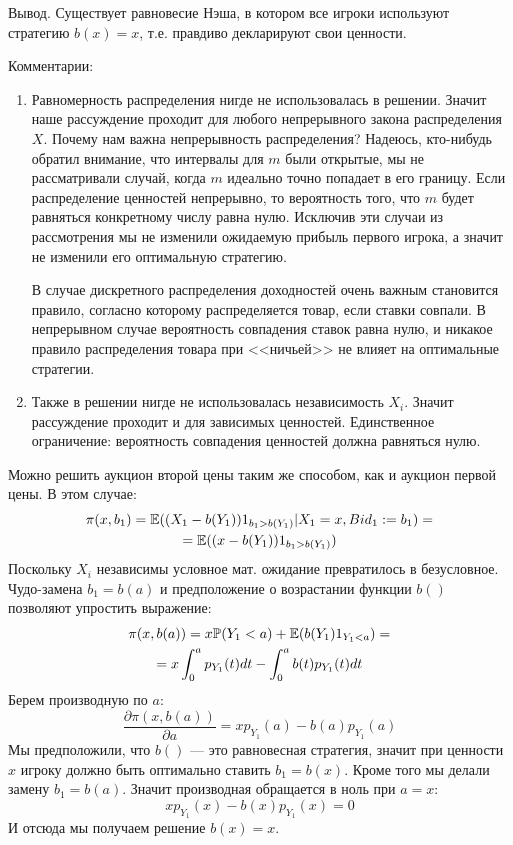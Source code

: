 \begin{enumerate}
Вывод. Существует равновесие Нэша, в котором все игроки используют стратегию $ b(x)=x $, т.е. правдиво декларируют свои ценности.

Комментарии:
\begin{enumerate}
\item Равномерность распределения нигде не использовалась в решении. Значит наше рассуждение проходит для любого непрерывного закона распределения $ X $.
Почему нам важна непрерывность распределения? Надеюсь, кто-нибудь обратил внимание, что интервалы для $ m $ были открытые, мы не рассматривали случай, когда $ m $ идеально точно попадает в его границу. Если распределение ценностей непрерывно, то вероятность того, что $ m $ будет равняться конкретному числу равна нулю. Исключив эти случаи из рассмотрения мы не изменили ожидаемую прибыль первого игрока, а значит не изменили его оптимальную стратегию. 

В случае дискретного распределения доходностей очень важным становится правило, согласно которому распределяется товар, если ставки совпали. В непрерывном случае вероятность совпадения ставок равна нулю, и никакое правило распределения товара при <<ничьей>> не влияет на оптимальные стратегии.
\item Также в решении нигде не использовалась независимость $ X_{i} $. Значит рассуждение проходит и для зависимых ценностей. Единственное ограничение: вероятность совпадения ценностей должна равняться нулю.
\end{enumerate}


\begin{myex}
Можно решить аукцион второй цены таким же способом, как и аукцион первой цены. В этом случае:
\begin{multline}
\pi(x,b_{1})=\mathbb{E}((X_{1}-b(Y_{1}))1_{b_{1}>b(Y_{1})}|X_{1}=x,Bid_{1}:=b_{1})=\\
=\mathbb{E}((x-b(Y_{1}))1_{b_{1}>b(Y_{1})})
\end{multline}
Поскольку $ X_{i} $ независимы условное мат. ожидание превратилось в безусловное. Чудо-замена $ b_{1}=b(a) $ и предположение о возрастании функции $ b() $ позволяют упростить выражение:
\begin{multline}
\pi(x,b(a))=x\mathbb{P}(Y_{1}<a)+\mathbb{E}(b(Y_{1})1_{Y_{1}<a})=\\
=x\int_{0}^{a}p_{Y_{1}}(t)dt-\int_{0}^{a}b(t)p_{Y_{1}}(t)dt
\end{multline}
Берем производную по $ a $:
\begin{equation}
\frac{\partial \pi(x,b(a))}{\partial a}=xp_{Y_{1}}(a)-b(a)p_{Y_{1}}(a)
\end{equation}
Мы предположили, что $ b() $ --- это равновесная стратегия, значит при ценности $ x $ игроку должно быть оптимально ставить $ b_{1}=b(x) $. Кроме того мы делали замену $ b_{1}=b(a) $. Значит производная обращается в ноль при $ a=x $:
\begin{equation}
xp_{Y_{1}}(x)-b(x)p_{Y_{1}}(x)=0
\end{equation}
И отсюда мы получаем решение $b(x)=x$.


\end{myex}
\end{enumerate}
